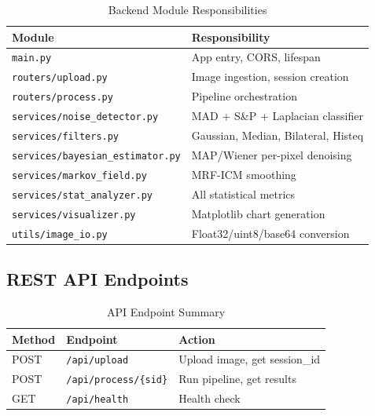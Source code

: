 \documentclass[10pt,conference]{IEEEtran}
\begin{document}
\begin{table}[h]
\caption{Backend Module Responsibilities}
\centering
\begin{tabular}{@{}p{3.5cm}p{4.5cm}@{}}
\toprule
\textbf{Module} & \textbf{Responsibility} \\
\midrule
\texttt{main.py} & App entry, CORS, lifespan \\
\texttt{routers/upload.py} & Image ingestion, session creation \\
\texttt{routers/process.py} & Pipeline orchestration \\
\texttt{services/noise\_detector.py} & MAD + S\&P + Laplacian classifier \\
\texttt{services/filters.py} & Gaussian, Median, Bilateral, Histeq \\
\texttt{services/bayesian\_estimator.py} & MAP/Wiener per-pixel denoising \\
\texttt{services/markov\_field.py} & MRF-ICM smoothing \\
\texttt{services/stat\_analyzer.py} & All statistical metrics \\
\texttt{services/visualizer.py} & Matplotlib chart generation \\
\texttt{utils/image\_io.py} & Float32/uint8/base64 conversion \\
\bottomrule
\end{tabular}
\end{table}

\subsection{REST API Endpoints}
\begin{table}[h]
\caption{API Endpoint Summary}
\centering
\begin{tabular}{@{}p{1.5cm}p{3cm}p{3cm}@{}}
\toprule
\textbf{Method} & \textbf{Endpoint} & \textbf{Action} \\
\midrule
POST & \texttt{/api/upload} & Upload image, get session\_id \\
POST & \texttt{/api/process/\{sid\}} & Run pipeline, get results \\
GET  & \texttt{/api/health} & Health check \\
\bottomrule
\end{tabular}
\end{table}
\end{document}
